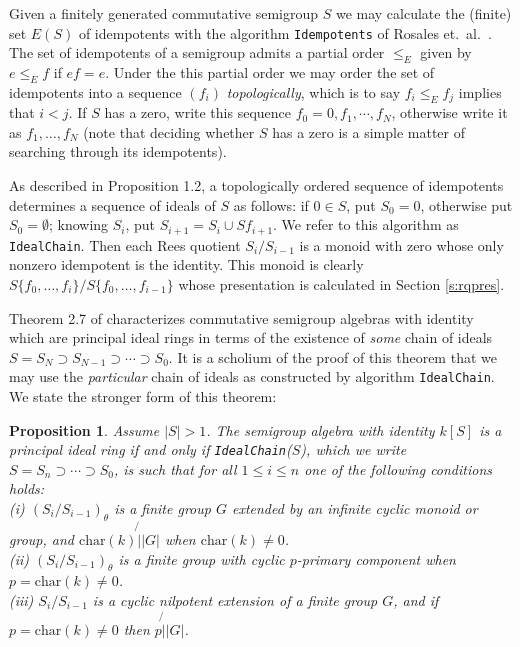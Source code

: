 \documentclass{acmconf}
\def\char{{\mbox{char}}}
\newtheorem{proposition}{Proposition}
\begin{document}
Given a finitely generated commutative semigroup $S$ we
may calculate the (finite) set $E(S)$ of idempotents with the algorithm
{\tt Idempotents} of Rosales et.~al.~\cite{pRGG99}. 
The set of idempotents of a semigroup admits a partial order
$\leq_E$ given by $e \leq_E f$ if $ef = e$.
Under the this partial order we may order the set of idempotents
into a sequence $(f_i)$ {\em topologically}, which is to 
say $f_i \leq_E f_j$ implies that $i < j$. 
If $S$ has a zero, write this sequence $f_0 = 0, f_1, \cdots, f_N$,
otherwise write it as $f_1, \ldots, f_N$
(note that deciding whether $S$ has a zero is a simple matter of 
searching through its idempotents).

As described in \cite{pDJW91} Proposition 1.2,  a  topologically 
ordered sequence of idempotents determines a sequence of ideals
of $S$ as follows:
if $0 \in S$, put $S_0 = {0}$, otherwise put $S_0 = \emptyset$; 
knowing $S_i$, put $S_{i+1} = S_i \cup S f_{i+1}$. We refer to this
algorithm as {\tt IdealChain}.  Then
each Rees quotient $S_i/S_{i-1}$ is a monoid with zero whose only
nonzero idempotent is the identity. This monoid is clearly
$S\{f_0, \ldots, f_i\} / S\{f_0, \ldots, f_{i-1}\}$ whose 
presentation is calculated in Section \ref{s:rqpres}.
 
Theorem 2.7 of \cite{pDJW91} characterizes commutative semigroup
algebras with identity 
which are principal ideal rings  in terms of the existence of 
{\em some} chain of ideals $S = S_N \supset S_{N-1} 
\supset \cdots \supset S_0$. 
It is a scholium of the proof of this theorem that 
we may use the {\em particular} chain of ideals as constructed by
algorithm  {\tt IdealChain}. We state the stronger form of this 
theorem:
\begin{proposition}\label{p:djwthm}
Assume $|S| > 1$. The semigroup algebra with identity $k[S]$ is a
principal ideal ring if and only if {\tt IdealChain}($S$),
which we write $S=S_n \supset \cdots \supset S_0$, is
such that for all $1 \leq i \leq n$ one of the following conditions
holds:\\
(i) $(S_i/ S_{i-1})_\theta$ is a finite group $G$ extended by an
infinite cyclic monoid or group, and $\char(k) \not{|} |G|$ when
$\char(k) \neq 0$. \\
(ii)   $(S_i/ S_{i-1})_\theta$ is a finite group with 
cyclic $p$-primary component when $p = \char(k) \neq 0$.\\
(iii) $S_i/ S_{i-1}$ is a cyclic nilpotent extension of a
finite group $G$, and if $p  = \char(k) \neq 0$ then
$p  \not{|} |G|$. 
\end{proposition}
\end{document}
